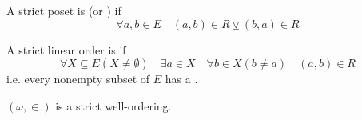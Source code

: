 \documentclass[notoc,notitlepage]{tufte-book}
\begin{document}
\begin{defn}
\label{defn:strict_totally_ordered_set}
  A strict poset is  (or ) if
  \begin{equation*}
    \forall a, b \in E \quad (a, b) \in R \veebar (b, a) \in R
  \end{equation*}
\end{defn}

\begin{defn}
\label{defn:well_order}
  A strict linear order is  if
  \begin{equation*}
    \forall X \subseteq E ( X \neq \emptyset ) \quad \exists a \in X \quad \forall b \in X ( b \neq a ) \quad (a, b) \in R
  \end{equation*}
  i.e. every nonempty subset of $E$ has a .
\end{defn}

\begin{propononum}
\label{propo:_omega_is_strictly_well_ordered}
  $(\omega, \in)$ is a strict well-ordering.
\end{propononum}




\appendix

\backmatter

\pagestyle{plain}

\nobibliography*
% 

\printindex
\end{document}
